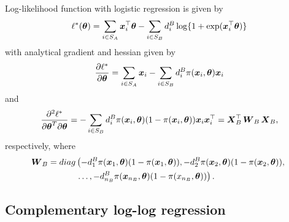 \documentclass[
  letterpaper,
  DIV=11,
  numbers=noendperiod]{scrreprt}
\begin{document}
Log-likelihood function with logistic regression is given by \[
\ell^{*}(\boldsymbol{\theta}) = \sum_{i \in S_A}\boldsymbol{x}_{i}^{\top}\boldsymbol{\theta} - \sum_{i \in S_B}d_{i}^{B}\log\{1 + \exp(\boldsymbol{x}_{i}^{\top}\boldsymbol{\theta})\}
\] with analytical gradient and hessian given by \[
\frac{\partial \ell^*}{\partial\boldsymbol{\theta}} = \sum_{i \in S_{A}}\boldsymbol{x}_{i} - \sum_{i \in S_{B}}d_{i}^{B}\pi(\boldsymbol{x}_{i}, \boldsymbol{\theta})\boldsymbol{x}_{i}
\] and \[
    \frac{\partial^{2} \ell^{*}}{\partial\boldsymbol{\theta}^{T} \partial\boldsymbol{\theta}} =- \sum_{i \in S_B}d_i^B\pi(\boldsymbol{x}_i,\boldsymbol{\theta})(1 - \pi(\boldsymbol{x}_i,\boldsymbol{\theta}))\boldsymbol{x}_i\boldsymbol{x}_i^{\top} = \boldsymbol{X}_B^{\top}\operatorname{\boldsymbol{W}}_{B}\boldsymbol{X}_B,
\] respectively, where \[
\begin{align*}
    \operatorname{\boldsymbol{W}}_{B} =
    diag & \left(-d_1^B\pi(\boldsymbol{x}_{1},\boldsymbol{\theta})(1 - \pi(\boldsymbol{x}_{1},\boldsymbol{\theta})), -d_2^B\pi(\boldsymbol{x}_{2},\boldsymbol{\theta})(1 - \pi(\boldsymbol{x}_{2},\boldsymbol{\theta})), \right. \\
     & \left. \ldots, -d_{n_{B}}^{B}\pi(\boldsymbol{x}_{n_{B}},\boldsymbol{\theta})(1 - \pi(x_{n_{B}},\boldsymbol{\theta}))\right).
\end{align*}
\]

\hypertarget{complementary-log-log-regression}{%
\subsection{Complementary log-log
regression}\label{complementary-log-log-regression}}
\end{document}
